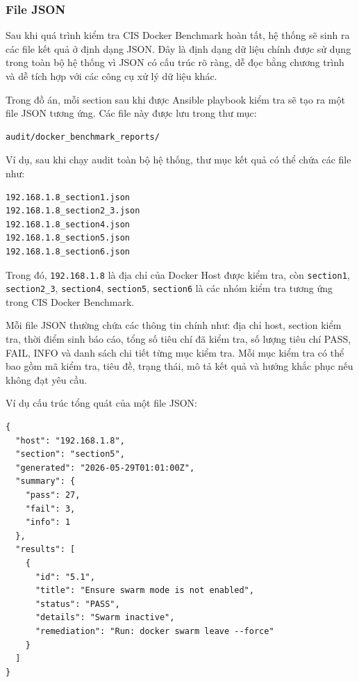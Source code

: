 \subsubsection{File JSON}\label{output-file-json}

Sau khi quá trình kiểm tra CIS Docker Benchmark hoàn tất, hệ thống sẽ sinh ra các file kết quả ở định dạng JSON. Đây là định dạng dữ liệu chính được sử dụng trong toàn bộ hệ thống vì JSON có cấu trúc rõ ràng, dễ đọc bằng chương trình và dễ tích hợp với các công cụ xử lý dữ liệu khác.

Trong đồ án, mỗi section sau khi được Ansible playbook kiểm tra sẽ tạo ra một file JSON tương ứng. Các file này được lưu trong thư mục:

\begin{verbatim}
audit/docker_benchmark_reports/
\end{verbatim}

Ví dụ, sau khi chạy audit toàn bộ hệ thống, thư mục kết quả có thể chứa các file như:

\begin{verbatim}
192.168.1.8_section1.json
192.168.1.8_section2_3.json
192.168.1.8_section4.json
192.168.1.8_section5.json
192.168.1.8_section6.json
\end{verbatim}

Trong đó, \texttt{192.168.1.8} là địa chỉ của Docker Host được kiểm tra, còn \texttt{section1}, \texttt{section2\_3}, \texttt{section4}, \texttt{section5}, \texttt{section6} là các nhóm kiểm tra tương ứng trong CIS Docker Benchmark.

Mỗi file JSON thường chứa các thông tin chính như: địa chỉ host, section kiểm tra, thời điểm sinh báo cáo, tổng số tiêu chí đã kiểm tra, số lượng tiêu chí PASS, FAIL, INFO và danh sách chi tiết từng mục kiểm tra. Mỗi mục kiểm tra có thể bao gồm mã kiểm tra, tiêu đề, trạng thái, mô tả kết quả và hướng khắc phục nếu không đạt yêu cầu.

Ví dụ cấu trúc tổng quát của một file JSON:

\begin{verbatim}
{
  "host": "192.168.1.8",
  "section": "section5",
  "generated": "2026-05-29T01:01:00Z",
  "summary": {
    "pass": 27,
    "fail": 3,
    "info": 1
  },
  "results": [
    {
      "id": "5.1",
      "title": "Ensure swarm mode is not enabled",
      "status": "PASS",
      "details": "Swarm inactive",
      "remediation": "Run: docker swarm leave --force"
    }
  ]
}
\end{verbatim}

